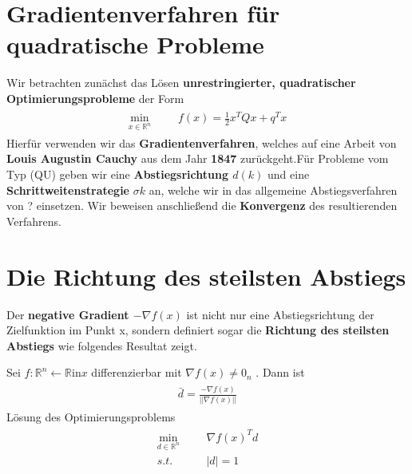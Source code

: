 \section{Gradientenverfahren für quadratische Probleme}
Wir betrachten zunächst das Lösen \textbf{unrestringierter, quadratischer Optimierungsprobleme} der Form
\begin{gather}
\label{eq:P}
\tag{QU}
\begin{aligned}
\min_{x\in \mathbb{R}^n}
& & & f(x) = \frac{1}{2}x^TQx+q^Tx
\end{aligned}
\end{gather}
Hierfür verwenden wir das \textbf{Gradientenverfahren}, welches auf eine Arbeit von \textbf{Louis Augustin Cauchy} aus dem Jahr \textbf{1847} zurückgeht.Für Probleme vom Typ (QU) geben wir eine  \textbf{Abstiegsrichtung $d(k)$} und
eine \textbf{Schrittweitenstrategie} $\sigma k$ an, welche wir in das allgemeine Abstiegsverfahren von ? einsetzen. Wir beweisen anschließend die \textbf{Konvergenz} des resultierenden Verfahrens.
\newpage
\section{Die Richtung des steilsten Abstiegs}

Der \textbf{negative Gradient $-\nabla f(x)$} ist nicht nur eine Abstiegsrichtung der Zielfunktion im Punkt x, sondern definiert sogar die \textbf{Richtung des steilsten Abstiegs} wie folgendes Resultat zeigt.

\begin{Lemma}
	Sei $f:\mathbb{R}^n \leftarrow \mathbb{R} \text{in} x$ differenzierbar mit $\nabla f(x) \neq 0_n$ . Dann ist \\
	\begin{gather}
	\begin{aligned}
	\bar d = \frac{-\nabla f(x)}{||\nabla f(x)||}
	\end{aligned}
	\end{gather}
Lösung des Optimierungsproblems
\begin{gather}
	\begin{aligned}
	\min_{d\in \mathbb{R}^n}
	& & & \nabla f(x)^T d \\
	s.t.
	& & & |d| = 1
\end{aligned}
\end{gather}
\end{Lemma}

